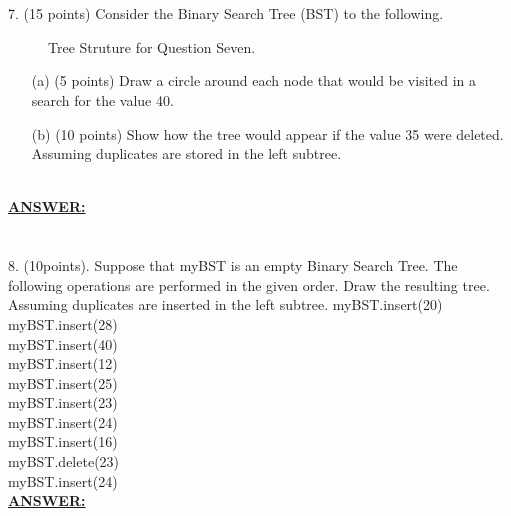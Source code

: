 \documentclass{article}
\newcommand{\answer}{\textbf{\\\underline{ANSWER:}\\}}
\begin{document}
\section*{}
7. (15 points) Consider the Binary Search Tree (BST) to the following.
\begin{figure}[htb]
  \begin{center}
    \caption{Tree Struture for Question Seven.}
  \end{center}
\end{figure}
\begin{enumerate}
\item[(a)](5 points)  Draw a circle around each node that would be visited in
a search for the value 40. 
\item[(b)](10 points)  Show how the tree would appear if the value 35 were
deleted. Assuming duplicates are stored in the left subtree. 
\end{enumerate}
\answer

\section*{}
8.  (10points). Suppose that myBST is an empty Binary Search Tree. The
following operations are performed in the given order. Draw the
resulting tree.  Assuming duplicates are inserted in the left
subtree. 
myBST.insert(20) \\
myBST.insert(28) \\
myBST.insert(40) \\
myBST.insert(12) \\
myBST.insert(25) \\
myBST.insert(23) \\
myBST.insert(24) \\
myBST.insert(16) \\
myBST.delete(23) \\
myBST.insert(24) 
\answer
\end{document}
